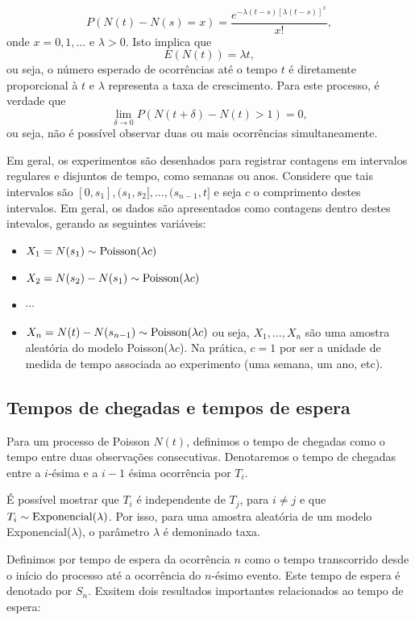 \documentclass[
  letterpaper,
  DIV=11,
  numbers=noendperiod]{scrreprt}
\providecommand{\tightlist}{%
  \setlength{\itemsep}{0pt}\setlength{\parskip}{0pt}}\usepackage{longtable,booktabs,array}
\theoremstyle{plain}
\theoremstyle{definition}
\theoremstyle{definition}
\theoremstyle{remark}
\begin{document}
\[P(N(t)-N(s)=x)=\frac{e^{-\lambda(t-s)[\lambda(t-s)]^x}}{x!},\] onde
\(x=0,1,\ldots\) e \(\lambda>0\). Isto implica que
\[E(N(t))=\lambda t,\] ou seja, o número esperado de ocorrências até o
tempo \(t\) é diretamente proporcional à \(t\) e \(\lambda\) representa
a taxa de crescimento. Para este processo, é verdade que
\[\lim_{\delta\rightarrow 0}P(N(t+\delta)-N(t)>1)=0,\] ou seja, não é
possível observar duas ou mais ocorrências simultaneamente.

Em geral, os experimentos são desenhados para registrar contagens em
intervalos regulares e disjuntos de tempo, como semanas ou anos.
Considere que tais intervalos são
\([0,s_1],(s_1,s_2],\ldots,(s_{n-1},t]\) e seja \(c\) o comprimento
destes intervalos. Em geral, os dados são apresentados como contagens
dentro destes intevalos, gerando as seguintes variáveis:

\begin{itemize}
\tightlist
\item
  \(X_1=N(s_1)\sim\hbox{Poisson}(\lambda c)\)
\item
  \(X_2=N(s_2)-N(s_1)\sim\hbox{Poisson}(\lambda c)\)
\item
  \(\cdots\)
\item
  \(X_n=N(t)-N(s_{n-1})\sim\hbox{Poisson}(\lambda c)\) ou seja,
  \(X_1,\ldots,X_n\) são uma amostra aleatória do modelo
  Poisson(\(\lambda c\)). Na prática, \(c=1\) por ser a unidade de
  medida de tempo associada ao experimento (uma semana, um ano, etc).
\end{itemize}

\subsection{Tempos de chegadas e tempos de
espera}\label{tempos-de-chegadas-e-tempos-de-espera}

Para um processo de Poisson \(N(t)\), definimos o tempo de chegadas como
o tempo entre duas observações consecutivas. Denotaremos o tempo de
chegadas entre a \(i\)-ésima e a \(i-1\) ésima ocorrência por \(T_i\).

É possível mostrar que \(T_i\) é independente de \(T_j\), para
\(i\neq j\) e que \(T_i\sim\hbox{Exponencial}(\lambda)\). Por isso, para
uma amostra aleatória de um modelo Exponencial(\(\lambda\)), o parâmetro
\(\lambda\) é demoninado taxa.

Definimos por tempo de espera da ocorrência \(n\) como o tempo
transcorrido desde o início do processo até a ocorrência do \(n\)-ésimo
evento. Este tempo de espera é denotado por \(S_n\). Exsitem dois
resultados importantes relacionados ao tempo de espera:
\end{document}
